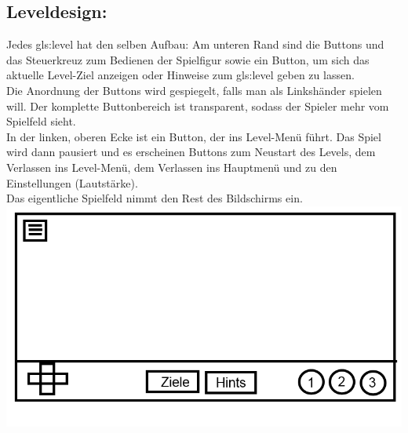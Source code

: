 \documentclass{scrartcl}
\begin{document}
\begin{enumerate}
	\begin{minipage}{1\textwidth}
		\item \subsection*{Leveldesign:} \label{appaufbau:Leveldesign}
		Jedes \gls{gls:level}  hat den selben Aufbau: Am unteren Rand sind die Buttons und das Steuerkreuz zum Bedienen der Spielfigur sowie ein Button, um sich das aktuelle Level-Ziel anzeigen oder Hinweise zum \gls{gls:level} geben zu lassen.\\ Die Anordnung der Buttons wird gespiegelt, falls man als Linkshänder spielen will. Der komplette Buttonbereich ist transparent, sodass der Spieler mehr vom Spielfeld sieht.\\
		In der linken, oberen Ecke ist ein Button, der ins Level-Menü führt. Das Spiel wird dann pausiert und es erscheinen Buttons zum Neustart des Levels, dem Verlassen ins Level-Menü, dem Verlassen ins Hauptmenü und zu den Einstellungen (Lautstärke).\\
		Das eigentliche Spielfeld nimmt den Rest des Bildschirms ein.\\
		\includegraphics[scale=0.5]{assets/LevelDesign2}
	\end{minipage}
	

\end{enumerate}
\end{document}
